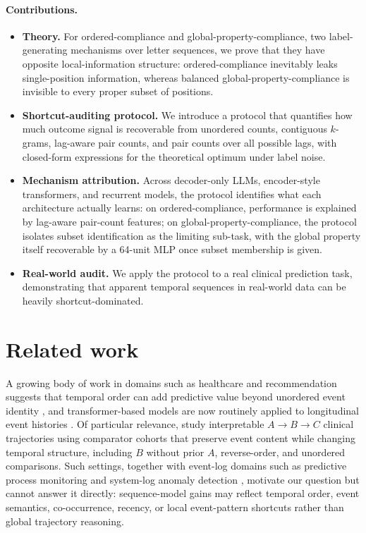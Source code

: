 \documentclass{article}
\theoremstyle{plain}
\theoremstyle{definition}
\theoremstyle{remark}
\begin{document}
\paragraph{Contributions.}
\begin{itemize}
\item \textbf{Theory.}
For ordered-compliance and global-property-compliance, two label-generating mechanisms over letter sequences, we prove that they have opposite local-information structure: ordered-compliance inevitably leaks single-position information, whereas balanced global-property-compliance is invisible to every proper subset of positions.
\item \textbf{Shortcut-auditing protocol.}
We introduce a protocol that quantifies how much outcome signal is recoverable from unordered counts, contiguous $k$-grams, lag-aware pair counts, and pair counts over all possible lags, with closed-form expressions for the theoretical optimum under label noise.
\item \textbf{Mechanism attribution.}
Across decoder-only LLMs, encoder-style transformers, and recurrent models, the protocol identifies what each architecture actually learns: on ordered-compliance, performance is explained by lag-aware pair-count features; on global-property-compliance, the protocol isolates subset identification as the limiting sub-task, with the global property itself recoverable by a 64-unit MLP once subset membership is given.
\item \textbf{Real-world audit.} 
We apply the protocol to a real clinical prediction task, demonstrating that apparent temporal sequences in real-world data can be heavily shortcut-dominated.
\end{itemize}

\section{Related work}
\label{sec:related_work}
A growing body of work in domains such as healthcare and recommendation suggests that temporal order can add predictive value beyond unordered event identity \citep{beaney2024coded_disease_representations,placido2023pancreatic_trajectories,pollington2026trajectory_review,kimLostSequenceLarge2025b}, and transformer-based models are now routinely applied to longitudinal event histories \citep{li2020behrt,rasmy2021medbert,savcisens2024using,delphi2025transformer}. Of particular relevance, \citet{edelman2026order_specific_ehr} study interpretable \(A\to B\to C\) clinical trajectories using comparator cohorts that preserve event content while changing temporal structure, including \(B\) without prior \(A\), reverse-order, and unordered comparisons. Such settings, together with event-log domains such as predictive process monitoring and system-log anomaly detection \citep{teinemaa2019outcome,du2017deeplog}, motivate our question but cannot answer it directly: sequence-model gains may reflect temporal order, event semantics, co-occurrence, recency, or local event-pattern shortcuts rather than global trajectory reasoning.
\end{document}
